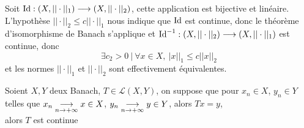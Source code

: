 \documentclass[a4paper,11pt, twoside]{article}
\begin{document}
\begin{Proof}
  Soit $\mathrm{\mathrm{Id}}:(X,||\cdot||_1)\longrightarrow(X,||\cdot||_2)$, cette application est bijective et linéaire. L'hypothèse $||\cdot||_2\leqslant c||\cdot||_1$ nous indique que $\mathrm{\mathrm{Id}}$ est continue, donc le théorème d'isomorphisme de Banach s'applique et $\mathrm{\mathrm{Id}}^{-1}:(X,||\cdot||_2)\longrightarrow(X,||\cdot||_1)$ est continue, donc 
  $$\exists c_2>0\ |\ \forall x\in X,\ |x||_1\leqslant c||x||_2$$
  et les normes $||\cdot||_1$ et $||\cdot||_2$ sont effectivement équivalentes.
\end{Proof}



\begin{prop}
  Soient $X,Y$ deux Banach, $T\in\mathcal L(X,Y)$, on suppose que pour $x_n\in X$, $y_n\in Y$ telles que $x_n\underset{n\to+\infty}{\longrightarrow} x\in X$, $y_n\underset{n\to+\infty}{\longrightarrow} y\in Y$, alors $Tx=y$,\\

  alors $T$ est continue
\end{prop}
\end{document}
